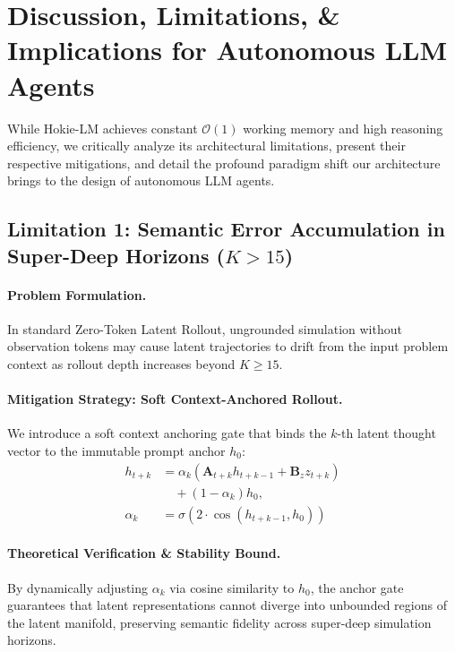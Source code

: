 \section{Discussion, Limitations, \& Implications for Autonomous LLM Agents}
\label{sec:discussion}

While Hokie-LM achieves constant $\mathcal{O}(1)$ working memory and high reasoning efficiency, we critically analyze its architectural limitations, present their respective mitigations, and detail the profound paradigm shift our architecture brings to the design of autonomous LLM agents.

\subsection{Limitation 1: Semantic Error Accumulation in Super-Deep Horizons ($K > 15$)}
\paragraph{Problem Formulation.}
In standard Zero-Token Latent Rollout, ungrounded simulation without observation tokens may cause latent trajectories to drift from the input problem context as rollout depth increases beyond $K \ge 15$.
\paragraph{Mitigation Strategy: Soft Context-Anchored Rollout.}
We introduce a soft context anchoring gate that binds the $k$-th latent thought vector to the immutable prompt anchor $h_0$:
\begin{equation}
\begin{split}
    h_{t+k} &= \alpha_k \left( \mathbf{A}_{t+k} h_{t+k-1} + \mathbf{B}_z z_{t+k} \right) \\
    &\quad + (1 - \alpha_k) h_0, \\
    \alpha_k &= \sigma\left( 2 \cdot \cos(h_{t+k-1}, h_0) \right)
\end{split}
\end{equation}
\paragraph{Theoretical Verification \& Stability Bound.}
By dynamically adjusting $\alpha_k$ via cosine similarity to $h_0$, the anchor gate guarantees that latent representations cannot diverge into unbounded regions of the latent manifold, preserving semantic fidelity across super-deep simulation horizons.

